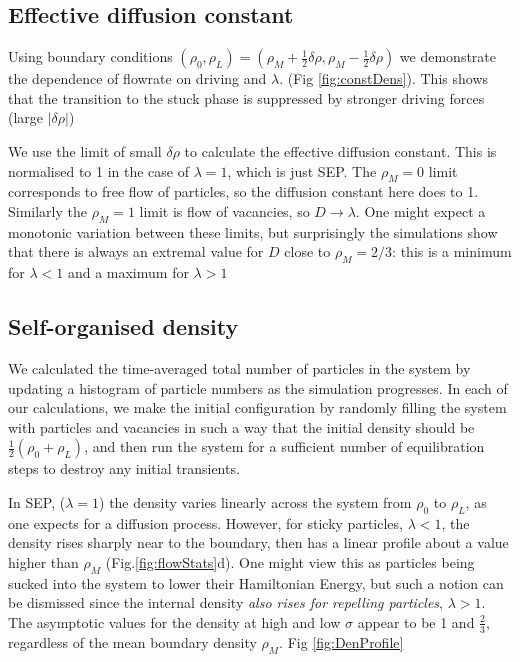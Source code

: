 \documentclass[
reprint, amsmath,amssymb, aps,
]{revtex4-1}
\begin{document}
\subsection{Effective diffusion constant}


Using boundary conditions $(\rho_0, \rho_L) = (\rho_M + \frac{1}{2}
\delta\rho, \rho_M - \frac{1}{2} \delta\rho)$ we demonstrate the
dependence of flowrate on driving and $\lambda$.  (Fig \ref{fig:constDens}).  This
shows that the transition to the stuck phase is suppressed by stronger
driving forces (large $|\delta\rho|$)

We use the limit of small $\delta\rho$ to calculate the effective
diffusion constant.  This is normalised to 1 in the case of
$\lambda=1$, which is just SEP.  The $\rho_M=0$ limit corresponds to
free flow of particles, so the diffusion constant here does to
1. Similarly the $\rho_M=1$ limit is flow of vacancies, so
$D\rightarrow\lambda$.  One might expect a monotonic variation between
these limits, but surprisingly the simulations show that there is
always an extremal value for $D$ close to $\rho_M=2/3$: this is a
minimum for $\lambda<1$ and a maximum for $\lambda>1$


\subsection{Self-organised density}


We calculated the time-averaged total number of particles in
the system by updating a histogram of particle numbers
as the simulation progresses. In each of our calculations, we make the
initial configuration by randomly filling the system with particles
and vacancies in such a way that the initial density should be
$\frac{1}{2}(\rho_0 + \rho_L)$, and then run the system for a
sufficient number of equilibration steps to destroy any initial
transients.

In SEP, ($\lambda=1$) the density varies linearly across the system
from $\rho_0$ to $\rho_L$, as one expects for a diffusion process.
However, for sticky particles, $\lambda<1$, the density rises sharply
near to the boundary, then has a linear profile about a value higher
than $\rho_M$  (Fig.\ref{fig:flowStats}d). 
One might view this as particles being sucked into the
system to lower their Hamiltonian Energy, but such a notion can be
dismissed since the internal density {\it also rises for repelling
  particles}, $\lambda>1$.  The asymptotic values for the density at
high and low $\sigma$ appear to be 1 and $\frac{2}{3}$, regardless of the 
mean boundary density $\rho_M$.
Fig \ref{fig:DenProfile} 
\end{document}
